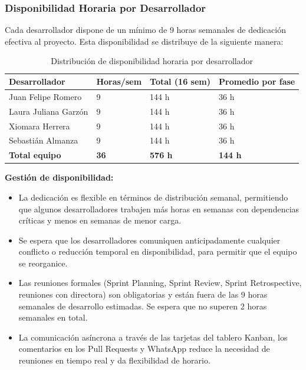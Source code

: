 \documentclass{article}
\begin{document}
\subsubsection{Disponibilidad Horaria por Desarrollador}

Cada desarrollador dispone de un mínimo de 9 horas semanales de dedicación efectiva al proyecto. Esta disponibilidad se distribuye de la siguiente manera:

\begin{table}[H]
\centering
\small
\begin{tabular}{|p{3cm}|p{1.8cm}|p{2cm}|p{2.5cm}|}
\hline
\textbf{Desarrollador} & \textbf{Horas/sem} & \textbf{Total (16 sem)} & \textbf{Promedio por fase} \\
\hline
Juan Felipe Romero & 9 & 144 h & 36 h \\
\hline
Laura Juliana Garzón & 9 & 144 h & 36 h \\
\hline
Xiomara Herrera & 9 & 144 h & 36 h \\
\hline
Sebastián Almanza & 9 & 144 h & 36 h \\
\hline
\textbf{Total equipo} & \textbf{36} & \textbf{576 h} & \textbf{144 h} \\
\hline
\end{tabular}
\caption{Distribución de disponibilidad horaria por desarrollador}
\label{tab:disponibilidad}
\end{table}

\textbf{Gestión de disponibilidad:}

\begin{itemize}
    \item La dedicación es flexible en términos de distribución semanal, permitiendo que algunos desarrolladores trabajen más horas en semanas con dependencias críticas y menos en semanas de menor carga.
    
    \item Se espera que los desarrolladores comuniquen anticipadamente cualquier conflicto o reducción temporal en disponibilidad, para permitir que el equipo se reorganice.
    
    \item Las reuniones formales (Sprint Planning, Sprint Review, Sprint Retrospective, reuniones con directora) son obligatorias y están fuera de las 9 horas semanales de desarrollo estimadas. Se espera que no superen 2 horas semanales en total.
    
    \item La comunicación asíncrona a través de las tarjetas del tablero Kanban, los comentarios en los Pull Requests y WhatsApp reduce la necesidad de reuniones en tiempo real y da flexibilidad de horario.
\end{itemize}
\end{document}
